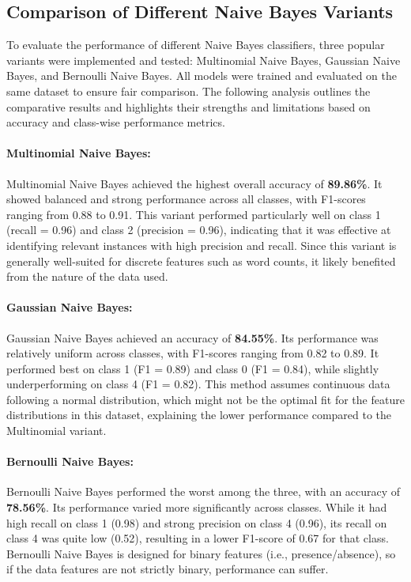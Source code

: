 \documentclass[a4paper,12pt]{article}
\begin{document}
\subsection{Comparison of Different Naive Bayes Variants}

To evaluate the performance of different Naive Bayes classifiers, three popular variants were implemented and tested: Multinomial Naive Bayes, Gaussian Naive Bayes, and Bernoulli Naive Bayes. All models were trained and evaluated on the same dataset to ensure fair comparison. The following analysis outlines the comparative results and highlights their strengths and limitations based on accuracy and class-wise performance metrics.

\paragraph{Multinomial Naive Bayes:}

Multinomial Naive Bayes achieved the highest overall accuracy of \textbf{89.86\%}. It showed balanced and strong performance across all classes, with F1-scores ranging from 0.88 to 0.91. This variant performed particularly well on class 1 (recall = 0.96) and class 2 (precision = 0.96), indicating that it was effective at identifying relevant instances with high precision and recall. Since this variant is generally well-suited for discrete features such as word counts, it likely benefited from the nature of the data used.

\paragraph{Gaussian Naive Bayes:}

Gaussian Naive Bayes achieved an accuracy of \textbf{84.55\%}. Its performance was relatively uniform across classes, with F1-scores ranging from 0.82 to 0.89. It performed best on class 1 (F1 = 0.89) and class 0 (F1 = 0.84), while slightly underperforming on class 4 (F1 = 0.82). This method assumes continuous data following a normal distribution, which might not be the optimal fit for the feature distributions in this dataset, explaining the lower performance compared to the Multinomial variant.

\paragraph{Bernoulli Naive Bayes:}

Bernoulli Naive Bayes performed the worst among the three, with an accuracy of \textbf{78.56\%}. Its performance varied more significantly across classes. While it had high recall on class 1 (0.98) and strong precision on class 4 (0.96), its recall on class 4 was quite low (0.52), resulting in a lower F1-score of 0.67 for that class. Bernoulli Naive Bayes is designed for binary features (i.e., presence/absence), so if the data features are not strictly binary, performance can suffer.
\end{document}
